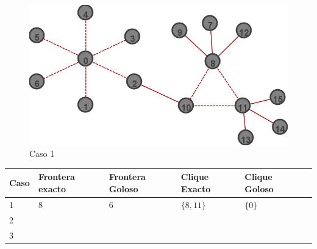 \begin{figure}[H]
\centering\includegraphics[width=11 cm]{goloso/labl.png}
\caption{Caso 1}
\end{figure}

\begin{center}
    \begin{tabular}{ | l | l | l | l | l | p{5cm} |}
    \hline
    Caso & Frontera exacto & Frontera Goloso & Clique Exacto & Clique Goloso \\ \hline
    1 & 8 & 6 & $\{8,11\}$ & $\{0\}$ \\ \hline
    2 &  &  &  & \\ \hline
    3 &  &  &  & \\
	\hline
    \end{tabular}
\end{center}
